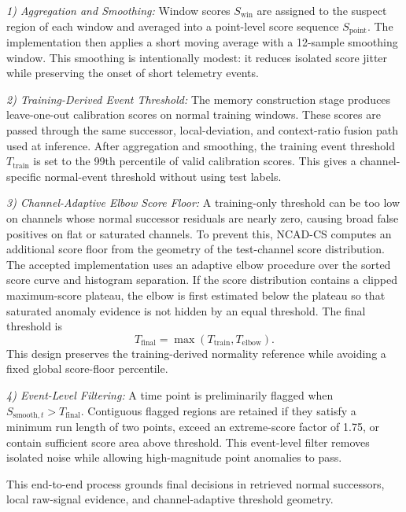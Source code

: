 \documentclass[journal]{IEEEtran}
\begin{document}
\textit{1) Aggregation and Smoothing:} Window scores $S_{\text{win}}$ are assigned to the suspect region of each window and averaged into a point-level score sequence $S_{\text{point}}$. The implementation then applies a short moving average with a 12-sample smoothing window. This smoothing is intentionally modest: it reduces isolated score jitter while preserving the onset of short telemetry events.

\textit{2) Training-Derived Event Threshold:} The memory construction stage produces leave-one-out calibration scores on normal training windows. These scores are passed through the same successor, local-deviation, and context-ratio fusion path used at inference. After aggregation and smoothing, the training event threshold $T_{\text{train}}$ is set to the 99th percentile of valid calibration scores. This gives a channel-specific normal-event threshold without using test labels.

\textit{3) Channel-Adaptive Elbow Score Floor:} A training-only threshold can be too low on channels whose normal successor residuals are nearly zero, causing broad false positives on flat or saturated channels. To prevent this, NCAD-CS computes an additional score floor from the geometry of the test-channel score distribution. The accepted implementation uses an adaptive elbow procedure over the sorted score curve and histogram separation. If the score distribution contains a clipped maximum-score plateau, the elbow is first estimated below the plateau so that saturated anomaly evidence is not hidden by an equal threshold. The final threshold is
\begin{equation}
    T_{\text{final}} = \max(T_{\text{train}}, T_{\text{elbow}}).
    \label{eq:t_final_revised}
\end{equation}
This design preserves the training-derived normality reference while avoiding a fixed global score-floor percentile.

\textit{4) Event-Level Filtering:} A time point is preliminarily flagged when $S_{\text{smooth},t} > T_{\text{final}}$. Contiguous flagged regions are retained if they satisfy a minimum run length of two points, exceed an extreme-score factor of 1.75, or contain sufficient score area above threshold. This event-level filter removes isolated noise while allowing high-magnitude point anomalies to pass.

This end-to-end process grounds final decisions in retrieved normal successors, local raw-signal evidence, and channel-adaptive threshold geometry.
\end{document}
